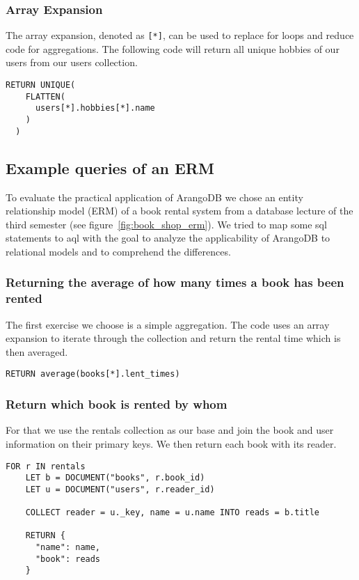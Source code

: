 \subsubsection{Array Expansion}

The array expansion, denoted as \texttt{[*]}, can be used to replace for loops and reduce code for aggregations. The following code will return all unique hobbies of our users from our users collection.

\begin{lstlisting}[language=ArangoQL]
  RETURN UNIQUE(
    FLATTEN(
      users[*].hobbies[*].name
    )
  )
\end{lstlisting}

\subsection{Example queries of an ERM}

To evaluate the practical application of ArangoDB we chose an entity relationship model (ERM) of a book rental system from a database lecture of the third semester (see figure~\ref{fig:book_shop_erm}). We tried to map some \gls{sql} statements to \gls{aql} with the goal to analyze the applicability of ArangoDB to relational models and to comprehend the differences.

\subsubsection{Returning the average of how many times a book has been rented}

The first exercise we choose is a simple aggregation. The code uses an array expansion to iterate through the collection and return the rental time which is then averaged.

\begin{lstlisting}[language=ArangoQL]
  RETURN average(books[*].lent_times)
\end{lstlisting}

\subsubsection{Return which book is rented by whom}

For that we use the rentals collection as our base and join the book and user information on their primary keys. We then return each book with its reader.

\begin{lstlisting}[language=ArangoQL]
  FOR r IN rentals
    LET b = DOCUMENT("books", r.book_id)
    LET u = DOCUMENT("users", r.reader_id)
    
    COLLECT reader = u._key, name = u.name INTO reads = b.title

    RETURN {
      "name": name,
      "book": reads
    }
\end{lstlisting}

